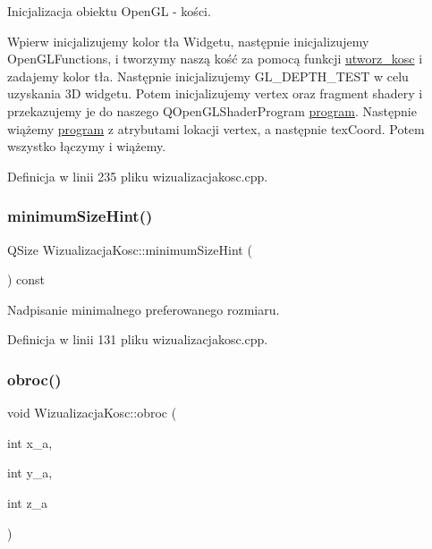 Inicjalizacja obiektu Open\+GL -\/ kości. 

Wpierw inicjalizujemy kolor tła Widgetu, następnie inicjalizujemy Open\+G\+L\+Functions, i tworzymy naszą kość za pomocą funkcji \hyperlink{}{utworz\+\_\+kosc} i zadajemy kolor tła. Następnie inicjalizujemy G\+L\+\_\+\+D\+E\+P\+T\+H\+\_\+\+T\+E\+ST w celu uzyskania 3D widgetu. Potem inicjalizujemy vertex oraz fragment shadery i przekazujemy je do naszego Q\+Open\+G\+L\+Shader\+Program \hyperlink{}{program}. Następnie wiążemy \hyperlink{}{program} z atrybutami lokacji vertex, a następnie tex\+Coord. Potem wszystko łączymy i wiążemy. 

Definicja w linii 235 pliku wizualizacjakosc.\+cpp.

\mbox{\label{class_wizualizacja_kosc_a075e8afed64bd351d12a4d363e0259ad}} 
\subsubsection{\texorpdfstring{minimum\+Size\+Hint()}{minimumSizeHint()}}
{\footnotesize\ttfamily Q\+Size Wizualizacja\+Kosc\+::minimum\+Size\+Hint (\begin{DoxyParamCaption}{ }\end{DoxyParamCaption}) const\hspace{0.3cm}{\ttfamily [override]}}



Nadpisanie minimalnego preferowanego rozmiaru. 



Definicja w linii 131 pliku wizualizacjakosc.\+cpp.

\mbox{\label{class_wizualizacja_kosc_abd638267982c1c65610501551ffec3b0}} 
\subsubsection{\texorpdfstring{obroc()}{obroc()}}
{\footnotesize\ttfamily void Wizualizacja\+Kosc\+::obroc (\begin{DoxyParamCaption}\item[{int}]{x\+\_\+a,  }\item[{int}]{y\+\_\+a,  }\item[{int}]{z\+\_\+a }\end{DoxyParamCaption})}



